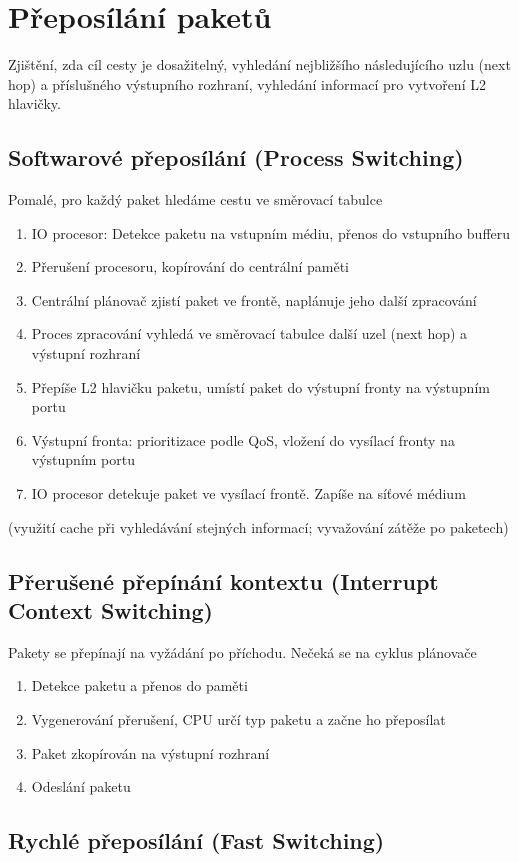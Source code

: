 \documentclass[a4paper, 11pt]{report}
\begin{document}
\section{Přeposílání paketů}
Zjištění, zda cíl cesty je dosažitelný, vyhledání nejbližšího následujícího uzlu (next hop) a příslušného výstupního rozhraní, vyhledání informací pro vytvoření L2 hlavičky.

\subsection{Softwarové přeposílání (Process Switching)}
Pomalé, pro každý paket hledáme cestu ve směrovací tabulce
\begin{enumerate}
	\item IO procesor: Detekce paketu na vstupním médiu, přenos do vstupního bufferu
	\item Přerušení procesoru, kopírování do centrální paměti
	\item Centrální plánovač zjistí paket ve frontě, naplánuje jeho další zpracování
	\item Proces zpracování vyhledá ve směrovací tabulce další uzel (next hop) a výstupní rozhraní
	\item Přepíše L2 hlavičku paketu, umístí paket do výstupní fronty na výstupním portu
	\item Výstupní fronta: prioritizace podle QoS, vložení do vysílací fronty na výstupním portu
	\item IO procesor detekuje paket ve vysílací frontě. Zapíše na síťové médium
\end{enumerate}
(využití cache při vyhledávání stejných informací; vyvažování zátěže po paketech)

\subsection{Přerušené přepínání kontextu (Interrupt Context Switching)}
Pakety se přepínají na vyžádání po příchodu. Nečeká se na cyklus plánovače
\begin{enumerate}
	\item Detekce paketu a přenos do paměti
	\item Vygenerování přerušení, CPU určí typ paketu a začne ho přeposílat
	\item Paket zkopírován na výstupní rozhraní
	\item Odeslání paketu
\end{enumerate}

\subsection{Rychlé přeposílání (Fast Switching)}
\end{document}
